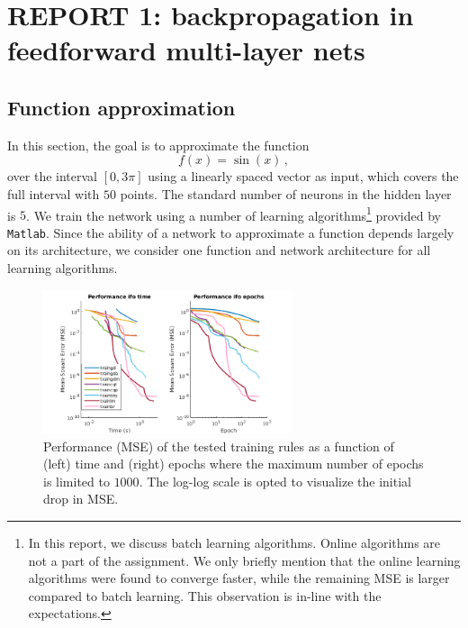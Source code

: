 \documentclass[pdftex,11pt,a4paper]{article}
\begin{document}
\begin{titlepage}

\end{titlepage}

\tableofcontents
\newpage

\section{REPORT 1: backpropagation in feedforward multi-layer nets}
\subsection{Function approximation}
In this section, the goal is to approximate the function
\begin{equation}\label{eq:myfunction}
f(x) = \sin(x)\,,
\end{equation}
over the interval $[0,3\pi]$ using a linearly spaced vector as input, which covers the full interval with $50$ points. The standard number of neurons in the hidden layer is $5$. We train the network using a number of learning algorithms\footnote{In this report, we discuss batch learning algorithms. Online algorithms are not a part of the assignment. We only briefly mention that the online learning algorithms were found to converge faster, while the remaining MSE is larger compared to batch learning. This observation is in-line with the expectations.} provided by \texttt{Matlab}. Since the ability of a network to approximate a function depends largely on its architecture, we consider one function and network architecture for all learning algorithms.

\begin{figure}[htb]
\centering
\includegraphics[width=0.65\textwidth]{figs/performance_plot.png}
\caption{Performance (MSE) of the tested training rules as a function of (left) time and (right) epochs where the maximum number of epochs is limited to $1000$. The log-log scale is opted to visualize the initial drop in MSE. \label{fig:performace_plot}}
\end{figure}
\end{document}
